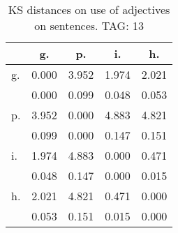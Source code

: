 \begin{table}[h!]
\begin{center}
\begin{tabular}{| l | c | c | c | c |}\hline
 & g. & p. & i. & h. \\\hline
g. & 0.000  & 3.952  & 1.974  & 2.021 \\\hline
 & 0.000  & 0.099  & 0.048  & 0.053 \\\hline
p. & 3.952  & 0.000  & 4.883  & 4.821 \\\hline
 & 0.099  & 0.000  & 0.147  & 0.151 \\\hline
i. & 1.974  & 4.883  & 0.000  & 0.471 \\\hline
 & 0.048  & 0.147  & 0.000  & 0.015 \\\hline
h. & 2.021  & 4.821  & 0.471  & 0.000 \\\hline
 & 0.053  & 0.151  & 0.015  & 0.000 \\\hline
\end{tabular}
\caption{KS distances on use of adjectives on sentences. TAG: 13}
\end{center}
\end{table}